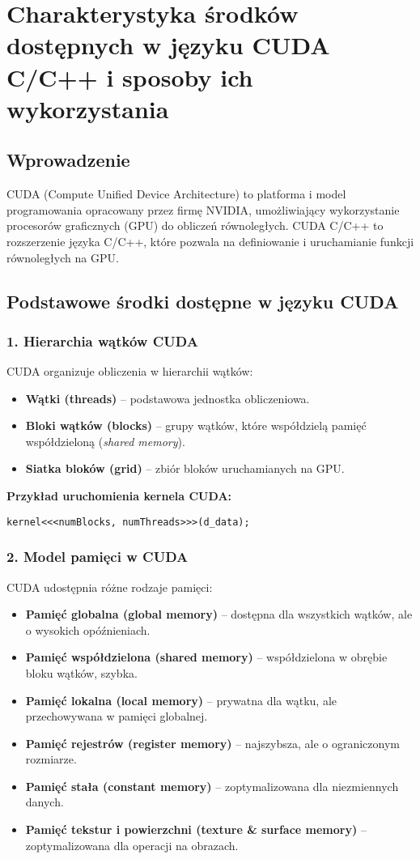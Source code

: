 \section{Charakterystyka środków dostępnych w języku CUDA C/C++ i sposoby ich wykorzystania}

\subsection{Wprowadzenie}
CUDA (Compute Unified Device Architecture) to platforma i model programowania opracowany przez firmę NVIDIA, umożliwiający wykorzystanie procesorów graficznych (GPU) do obliczeń równoległych. CUDA C/C++ to rozszerzenie języka C/C++, które pozwala na definiowanie i uruchamianie funkcji równoległych na GPU.

\subsection{Podstawowe środki dostępne w języku CUDA}

\subsubsection{1. Hierarchia wątków CUDA}
CUDA organizuje obliczenia w hierarchii wątków:
\begin{itemize}
    \item \textbf{Wątki (threads)} – podstawowa jednostka obliczeniowa.
    \item \textbf{Bloki wątków (blocks)} – grupy wątków, które współdzielą pamięć współdzieloną (\textit{shared memory}).
    \item \textbf{Siatka bloków (grid)} – zbiór bloków uruchamianych na GPU.
\end{itemize}

\textbf{Przykład uruchomienia kernela CUDA:}
\begin{verbatim}
kernel<<<numBlocks, numThreads>>>(d_data);
\end{verbatim}

\subsubsection{2. Model pamięci w CUDA}
CUDA udostępnia różne rodzaje pamięci:
\begin{itemize}
    \item \textbf{Pamięć globalna (global memory)} – dostępna dla wszystkich wątków, ale o wysokich opóźnieniach.
    \item \textbf{Pamięć współdzielona (shared memory)} – współdzielona w obrębie bloku wątków, szybka.
    \item \textbf{Pamięć lokalna (local memory)} – prywatna dla wątku, ale przechowywana w pamięci globalnej.
    \item \textbf{Pamięć rejestrów (register memory)} – najszybsza, ale o ograniczonym rozmiarze.
    \item \textbf{Pamięć stała (constant memory)} – zoptymalizowana dla niezmiennych danych.
    \item \textbf{Pamięć tekstur i powierzchni (texture \& surface memory)} – zoptymalizowana dla operacji na obrazach.
\end{itemize}

